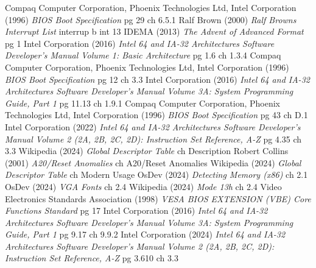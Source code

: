 \documentclass{article}
\begin{document}
\begin{thebibliography}{99}
		Compaq Computer Corporation, Phoenix Technologies Ltd, Intel Corporation (1996)
		\emph{BIOS Boot Specification}
		pg 29 ch 6.5.1
		Ralf Brown (2000)
		\emph{Ralf Browns Interrupt List}
		interrup b int 13
		IDEMA (2013)
		\emph{The Advent of Advanced Format}
		pg 1
		Intel Corporation (2016)
		\emph{Intel 64 and IA-32 Architectures Software Developer’s Manual Volume 1: Basic Architecture}
		pg 1.6 ch 1.3.4
		Compaq Computer Corporation, Phoenix Technologies Ltd, Intel Corporation (1996)
		\emph{BIOS Boot Specification}
		pg 12 ch 3.3
		Intel Corporation (2016)
		\emph{Intel 64 and IA-32 Architectures Software Developer’s Manual Volume 3A: System Programming Guide, Part 1}
		pg 11.13 ch 1.9.1
		Compaq Computer Corporation, Phoenix Technologies Ltd, Intel Corporation (1996)
		\emph{BIOS Boot Specification}
		pg 43 ch D.1
		Intel Corporation (2022)
		\emph{Intel 64 and IA-32 Architectures Software Developer’s Manual Volume 2 (2A, 2B, 2C, 2D): Instruction Set Reference, A-Z}
		pg 4.35 ch 3.3
		Wikipedia (2024)
		\emph{Global Descriptor Table}
		ch Description
		Robert Collins (2001)
		\emph{A20/Reset Anomalies}
		ch A20/Reset Anomalies
		Wikipedia (2024)
		\emph{Global Descriptor Table}
		ch Modern Usage
		OsDev (2024)
		\emph{Detecting Memory (x86)}
		ch 2.1
		OsDev (2024)
		\emph{VGA Fonts}
		ch 2.4
		Wikipedia (2024)
		\emph{Mode 13h}
		ch 2.4
		Video Electronics Standards Association (1998)
		\emph{VESA BIOS EXTENSION (VBE) Core Functions Standard}
		pg 17
		Intel Corporation (2016)
		\emph{Intel 64 and IA-32 Architectures Software Developer’s Manual Volume 3A: System Programming Guide, Part 1}
		pg 9.17 ch 9.9.2
		Intel Corporation (2024)
		\emph{Intel 64 and IA-32 Architectures Software Developer’s Manual Volume 2 (2A, 2B, 2C, 2D): Instruction Set Reference, A-Z}
		pg 3.610 ch 3.3
\end{thebibliography}
\end{document}
